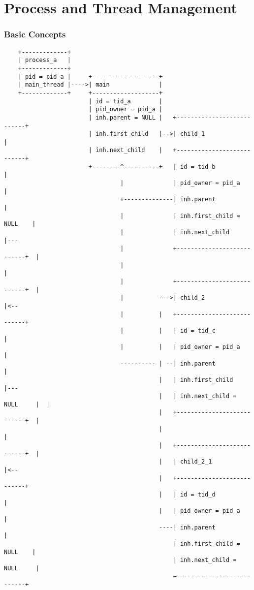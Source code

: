 \part{Process and Thread Management}

\section{Basic Concepts}

\begin{verbatim}
    +-------------+
    | process_a   |
    +-------------+
    | pid = pid_a |     +-------------------+
    | main_thread |---->| main              |
    +-------------+     +-------------------+
                        | id = tid_a        |
                        | pid_owner = pid_a |
                        | inh.parent = NULL |   +---------------------------+
                        | inh.first_child   |-->| child_1                   |
                        | inh.next_child    |   +---------------------------+
                        +--------^----------+   | id = tid_b                |
                                 |              | pid_owner = pid_a         |
                                 +--------------| inh.parent                |
                                 |              | inh.first_child = NULL    |
                                 |              | inh.next_child            |---
                                 |              +---------------------------+  |
                                 |                                             |
                                 |              +---------------------------+  |
                                 |          --->| child_2                   |<--
                                 |          |   +---------------------------+
                                 |          |   | id = tid_c                |
                                 |          |   | pid_owner = pid_a         |
                                 ---------- | --| inh.parent                |
                                            |   | inh.first_child           |---
                                            |   | inh.next_child = NULL     |  |
                                            |   +---------------------------+  |
                                            |                                  |
                                            |   +---------------------------+  |
                                            |   | child_2_1                 |<--
                                            |   +---------------------------+
                                            |   | id = tid_d                |
                                            |   | pid_owner = pid_a         |
                                            ----| inh.parent                |
                                                | inh.first_child = NULL    |
                                                | inh.next_child = NULL     |
                                                +---------------------------+
\end{verbatim}

